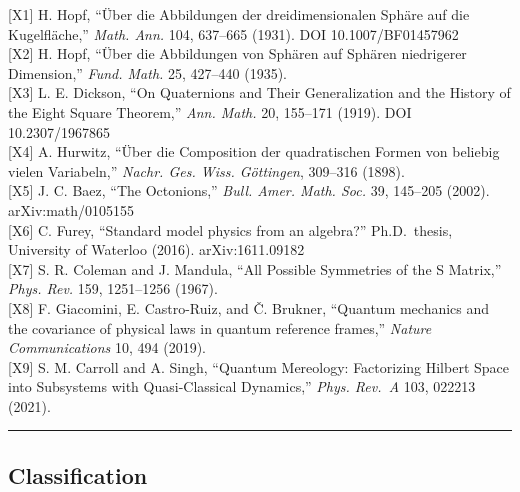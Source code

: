 \documentclass[
  a4paper,
]{article}
\begin{document}
{[}X1{]} H. Hopf, ``Über die Abbildungen der dreidimensionalen Sphäre
auf die Kugelfläche,'' \emph{Math. Ann.} 104, 637--665 (1931). DOI
10.1007/BF01457962\\
{[}X2{]} H. Hopf, ``Über die Abbildungen von Sphären auf Sphären
niedrigerer Dimension,'' \emph{Fund. Math.} 25, 427--440 (1935).\\
{[}X3{]} L. E. Dickson, ``On Quaternions and Their Generalization and
the History of the Eight Square Theorem,'' \emph{Ann. Math.} 20,
155--171 (1919). DOI 10.2307/1967865\\
{[}X4{]} A. Hurwitz, ``Über die Composition der quadratischen Formen von
beliebig vielen Variabeln,'' \emph{Nachr. Ges. Wiss. Göttingen},
309--316 (1898).\\
{[}X5{]} J. C. Baez, ``The Octonions,'' \emph{Bull. Amer. Math. Soc.}
39, 145--205 (2002). arXiv:math/0105155\\
{[}X6{]} C. Furey, ``Standard model physics from an algebra?''
Ph.D.~thesis, University of Waterloo (2016). arXiv:1611.09182\\
{[}X7{]} S. R. Coleman and J. Mandula, ``All Possible Symmetries of the
S Matrix,'' \emph{Phys. Rev.} 159, 1251--1256 (1967).\\
{[}X8{]} F. Giacomini, E. Castro-Ruiz, and \v{C}. Brukner, ``Quantum
mechanics and the covariance of physical laws in quantum reference
frames,'' \emph{Nature Communications} 10, 494 (2019).\\
{[}X9{]} S. M. Carroll and A. Singh, ``Quantum Mereology: Factorizing
Hilbert Space into Subsystems with Quasi-Classical Dynamics,''
\emph{Phys. Rev.~A} 103, 022213 (2021).

\begin{center}\rule{0.5\linewidth}{0.5pt}\end{center}

\subsection{Classification}\label{classification}
\end{document}
